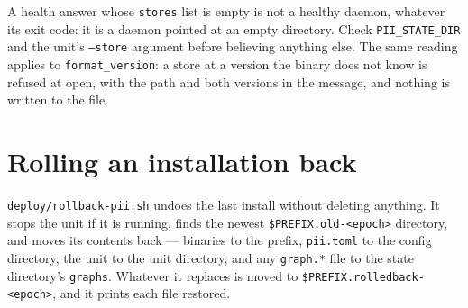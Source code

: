 \begin{center}
\end{center}

A health answer whose \texttt{stores} list is empty is not a healthy daemon, whatever its
exit code: it is a daemon pointed at an empty directory. Check
\texttt{PII\_STATE\_DIR} and the unit's \texttt{--store} argument before believing anything
else. The same reading applies to \texttt{format\_version}: a store at a version the binary
does not know is refused at open, with the path and both versions in the message, and
nothing is written to the file.

\section{Rolling an installation back}

\texttt{deploy/rollback-pii.sh} undoes the last install without deleting anything. It
stops the unit if it is running, finds the newest
\texttt{\$PREFIX.old-\textless{}epoch\textgreater{}} directory,
and moves its contents back --- binaries to the prefix, \texttt{pii.toml} to the config
directory, the unit to the unit directory, and any \texttt{graph.*} file to the state
directory's \texttt{graphs}. Whatever it replaces is moved to
\texttt{\$PREFIX.rolledback-\textless{}epoch\textgreater{}}, and it prints each file restored.

